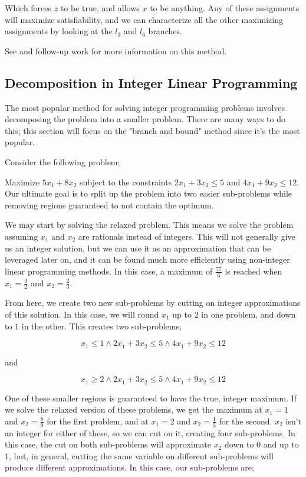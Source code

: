 Which forces $z$ to be true, and allows $x$ to be anything. Any of these assignments will maximize satisfiability, and we can characterize all the other maximizing assignments by looking at the $l_3$ and $l_6$ branches.

See \citep{belov2013sat} and follow-up work for more information on this method.

\subsection{Decomposition in Integer Linear Programming}\label{sec:ilp-blocks}

The most popular method for solving integer programming problems involves decomposing the problem into a smaller problem. There are many ways to do this; this section will focus on the "branch and bound" method since it's the most popular.

Consider the following problem;

Maximize $5x_1 + 8x_2$ subject to the constraints $2x_1 + 3x_2 \leq 5$ and $4x_1 + 9x_2 \leq 12$. Our ultimate goal is to split up the problem into two easier sub-problems while removing regions guaranteed to not contain the optimum.

We may start by solving the relaxed problem. This means we solve the problem assuming $x_1$ and $x_2$ are rationals instead of integers. This will not generally give us an integer solution, but we can use it as an approximation that can be leveraged later on, and it can be found much more efficiently using non-integer linear programming methods. In this case, a maximum of $\frac{77}{6}$ is reached when $x_1 = \frac{3}{2}$ and $x_2 = \frac{2}{3}$.

From here, we create two new sub-problems by cutting on integer approximations of this solution. In this case, we will round $x_1$ up to $2$ in one problem, and down to $1$ in the other. This creates two sub-problems;

\begin{equation}
    x_1 \leq 1 \wedge 2x_1 + 3x_2 \leq 5 \wedge 4x_1 + 9x_2 \leq 12
\end{equation}

and 

\begin{equation}
    x_1 \geq 2 \wedge 2x_1 + 3x_2 \leq 5 \wedge 4x_1 + 9x_2 \leq 12
\end{equation}

One of these smaller regions is guaranteed to have the true, integer maximum. If we solve the relaxed version of these problems, we get the maximum at $x_1 = 1$ and $x_2 = \frac{8}{9}$ for the first problem, and at $x_1 = 2$ and $x_2 = \frac{1}{3}$ for the second. $x_2$ isn't an integer for either of these, so we can cut on it, creating four sub-problems. In this case, the cut on both sub-problems will approximate $x_2$ down to $0$ and up to $1$, but, in general, cutting the same variable on different sub-problems will produce different approximations. In this case, our sub-problems are;

